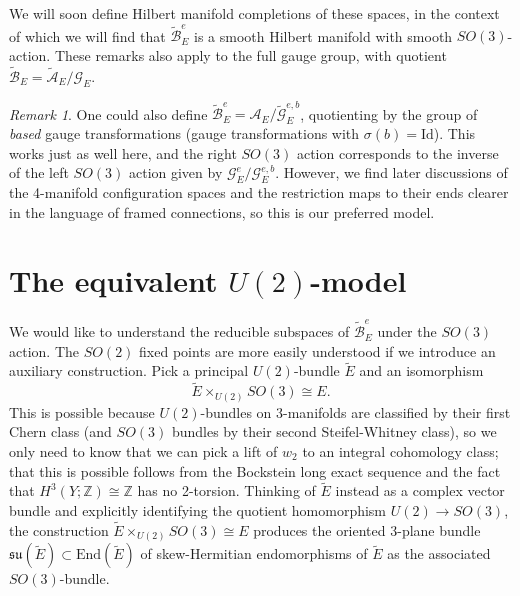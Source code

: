\documentclass[10pt,a4paper]{amsart}
\theoremstyle{definition}
\theoremstyle{remark}
\newtheorem{remark}[theorem]{Remark}
\numberwithin{figure}{qchap}
\begin{document}
We will soon define Hilbert manifold completions of these spaces, in the context of which we will find that $\widetilde{\mathcal B}^e_E$ is a smooth Hilbert manifold with smooth $SO(3)$-action. These remarks also apply to the full gauge group, with quotient $\widetilde{\mathcal B}_E = \widetilde{\mathcal A}_E/\mathcal G_E$.

\begin{remark}One could also define $\widetilde{\mathcal B}^e_E = \mathcal A_E/\widetilde{\mathcal G}_E^{e,b}$, quotienting by the group of \textit{based} gauge transformations (gauge transformations with $\sigma(b) = \text{Id}$). This works just as well here, and the right $SO(3)$ action corresponds to the inverse of the left $SO(3)$ action given by $\mathcal G_E^e/\mathcal G_E^{e,b}$. However, we find later discussions of the 4-manifold configuration spaces and the restriction maps to their ends clearer in the language of framed connections, so this is our preferred model.
\end{remark}

\section{The equivalent $U(2)$-model}\label{sec:config-U2}
We would like to understand the reducible subspaces of $\widetilde{\mathcal B}^e_E$ under the $SO(3)$ action. The $SO(2)$ fixed points are more easily understood if we introduce an auxiliary construction. Pick a principal $U(2)$-bundle $\tilde E$ and an isomorphism $$\tilde E \times_{U(2)} SO(3) \cong E.$$ This is possible because $U(2)$-bundles on 3-manifolds are classified by their first Chern class (and $SO(3)$ bundles by their second Steifel-Whitney class), so we only need to know that we can pick a lift of $w_2$ to an integral cohomology class; that this is possible follows from the Bockstein long exact sequence and the fact that $H^3(Y;\mathbb Z) \cong \mathbb Z$ has no 2-torsion. Thinking of $\tilde E$ instead as a complex vector bundle and explicitly identifying the quotient homomorphism $U(2) \to SO(3)$, the construction $\tilde E \times_{U(2)} SO(3) \cong E$ produces the oriented 3-plane bundle $\mathfrak{su}(\tilde E) \subset \text{End}(\tilde E)$ of skew-Hermitian endomorphisms of $\tilde E$ as the associated $SO(3)$-bundle.
\end{document}
